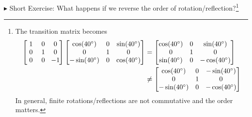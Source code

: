 $\blacktriangleright$ Short Exercise: What happens if we reverse the order of rotation/reflection?\footnote{The transition matrix becomes
\begin{align*}
\left[\begin{array}{@{\,}wc{8pt}wc{8pt}wc{8pt}@{\,}}
1 & 0 & 0 \\
0 & 1 & 0 \\
0 & 0 & -1
\end{array}\right]   
\begin{bmatrix}
\cos(40^\circ) & 0 & \sin(40^\circ) \\
0 & 1 & 0 \\
-\sin(40^\circ) & 0 & \cos(40^\circ)
\end{bmatrix}
&=
\begin{bmatrix}
\cos(40^\circ) & 0 & \sin(40^\circ) \\
0 & 1 & 0 \\
\sin(40^\circ) & 0 & -\cos(40^\circ)
\end{bmatrix} \\
&\neq 
\begin{bmatrix}
\cos(40^\circ) & 0 & -\sin(40^\circ) \\
0 & 1 & 0 \\
-\sin(40^\circ) & 0 & -\cos(40^\circ)
\end{bmatrix}
\end{align*}
In general, finite rotations/reflections are not commutative and the order matters.
}

